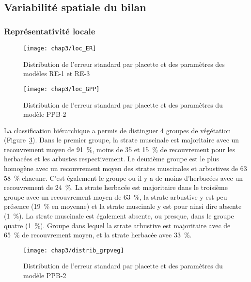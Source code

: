 \subsection{Variabilité spatiale du bilan}

\subsubsection{Représentativité locale}



\begin{figure}
\centering
\texttt{[image: chap3/loc\_ER]}
\caption{Distribution de l'erreur standard par placette et des paramètres des modèles RE-1 et RE-3}
\label{fig:loc_ER}
\end{figure}

\begin{figure}
\centering
\texttt{[image: chap3/loc\_GPP]}
\caption{Distribution de l'erreur standard par placette et des paramètres du modèle PPB-2}
\label{fig:loc_GPP}
\end{figure}

La classification hiérarchique a permis de distinguer 4 groupes de végétation (Figure~\ref{fig:distrib_grpveg}).
Dans le premier groupe, la strate muscinale est majoritaire avec un recouvrement moyen de \SI{91}{\percent}, moins de \num{35} et \SI{15}{\percent} de recouvrement pour les herbacées et les arbustes respectivement.
Le deuxième groupe est le plus homogène avec un recouvrement moyen des strates muscinales et arbustives de \num{63} \SI{58}{\percent} chacune.
C'est également le groupe ou il y a de moins d'herbacées avec un recouvrement de \SI{24}{\percent}.
La strate herbacée est majoritaire dans le troisième groupe avec un recouvrement moyen de \SI{63}{\percent}, la strate arbustive y est peu présence (\SI{19}{\percent} en moyenne) et la strate muscinale y est pour ainsi dire absente (\SI{1}{\percent}).
La strate muscinale est également absente, ou presque, dans le groupe quatre (\SI{1}{\percent}).
Groupe dans lequel la strate arbustive est majoritaire avec de \SI{65}{\percent} de recouvrement moyen, et la strate herbacée avec \SI{33}{\percent}.

\begin{figure}
\centering
\texttt{[image: chap3/distrib\_grpveg]}
\caption{Distribution de l'erreur standard par placette et des paramètres du modèle PPB-2}
\label{fig:distrib_grpveg}
\end{figure}


